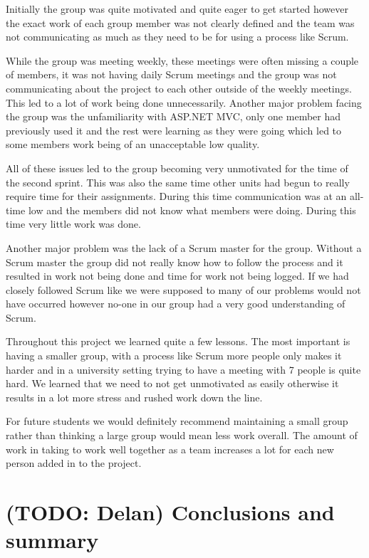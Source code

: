 \documentclass[a4paper,titlepage,12pt]{article}
\let\stdsection\section
\renewcommand\section{\newpage\stdsection}
\begin{document}
Initially the group was quite motivated and quite eager to get started however
the exact work of each group member was not clearly defined and the team was
not communicating as much as they need to be for using a process like Scrum.

While the group was meeting weekly, these meetings were often missing a couple
of members, it was not having daily Scrum meetings and the group was not
communicating about the project to each other outside of the weekly meetings.
This led to a lot of work being done unnecessarily. Another major problem
facing the group was the unfamiliarity with ASP.NET MVC, only one member had
previously used it and the rest were learning as they were going which led to
some members work being of an unacceptable low quality.

All of these issues led to the group becoming very unmotivated for the time of
the second sprint. This was also the same time other units had begun to really
require time for their assignments. During this time communication was at an
all-time low and the members did not know what members were doing. During this
time very little work was done.

Another major problem was the lack of a Scrum master for the group. Without a
Scrum master the group did not really know how to follow the process and it
resulted in work not being done and time for work not being logged. If we had
closely followed Scrum like we were supposed to many of our problems would not
have occurred however no-one in our group had a very good understanding of
Scrum.

Throughout this project we learned quite a few lessons. The most important is
having a smaller group, with a process like Scrum more people only makes it
harder and in a university setting trying to have a meeting with 7 people is
quite hard. We learned that we need to not get unmotivated as easily otherwise
it results in a lot more stress and rushed work down the line.

For future students we would definitely recommend maintaining a small group
rather than thinking a large group would mean less work overall. The amount of
work in taking to work well together as a team increases a lot for each new
person added in to the project.

\section{(TODO: Delan) Conclusions and summary}

\begin{sloppypar}
	\printbibliography
\end{sloppypar}
\end{document}
